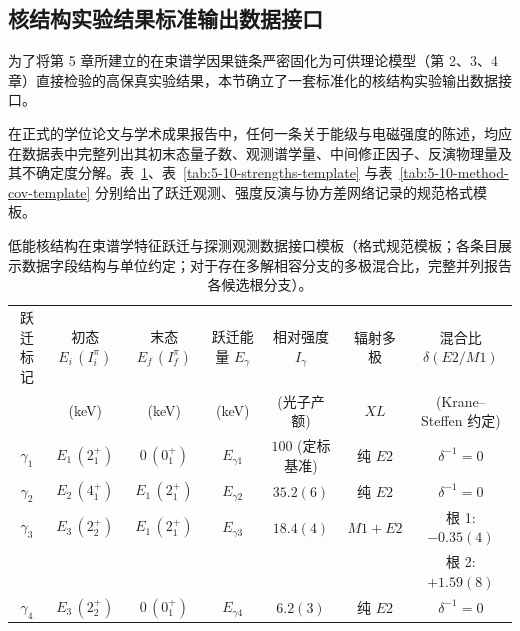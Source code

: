 \subsection{核结构实验结果标准输出数据接口}\label{subsec:5-10-5}

为了将第 5 章所建立的在束谱学因果链条严密固化为可供理论模型（第 2、3、4 章）直接检验的高保真实验结果，本节确立了一套标准化的核结构实验输出数据接口。

在正式的学位论文与学术成果报告中，任何一条关于能级与电磁强度的陈述，均应在数据表中完整列出其初末态量子数、观测谱学量、中间修正因子、反演物理量及其不确定度分解。表~\ref{tab:5-10-transitions-template}、表~\ref{tab:5-10-strengths-template} 与表~\ref{tab:5-10-method-cov-template} 分别给出了跃迁观测、强度反演与协方差网络记录的规范格式模板。

\begin{table}[!htbp]
\centering\small
\caption{低能核结构在束谱学特征跃迁与探测观测数据接口模板（格式规范模板；各条目展示数据字段结构与单位约定；对于存在多解相容分支的多极混合比，完整并列报告各候选根分支）。}
\label{tab:5-10-transitions-template}
\begin{tabular*}{\textwidth}{@{\extracolsep{\fill}}ccccccc@{}}
\toprule
跃迁标记 & 初态 $E_i\,(I_i^{\pi})$ & 末态 $E_f\,(I_f^{\pi})$ & 跃迁能量 $E_\gamma$ & 相对强度 $I_\gamma$ & 辐射多极 & 混合比 $\delta(E2/M1)$ \\
& (keV) & (keV) & (keV) & (光子产额) & $XL$ & (Krane--Steffen 约定) \\
\midrule
$\gamma_1$ & $E_1\,(2_1^+)$ & $0\,(0_1^+)$ & $E_{\gamma 1}$ & $100$ (定标基准) & 纯 $E2$ & $\delta^{-1} = 0$ \\
$\gamma_2$ & $E_2\,(4_1^+)$ & $E_1\,(2_1^+)$ & $E_{\gamma 2}$ & $35.2(6)$ & 纯 $E2$ & $\delta^{-1} = 0$ \\
$\gamma_3$ & $E_3\,(2_2^+)$ & $E_1\,(2_1^+)$ & $E_{\gamma 3}$ & $18.4(4)$ & $M1+E2$ & 根 1: $-0.35(4)$ \\
& & & & & & 根 2: $+1.59(8)$ \\
$\gamma_4$ & $E_3\,(2_2^+)$ & $0\,(0_1^+)$ & $E_{\gamma 4}$ & $6.2(3)$ & 纯 $E2$ & $\delta^{-1} = 0$ \\
\bottomrule
\end{tabular*}
\end{table}

